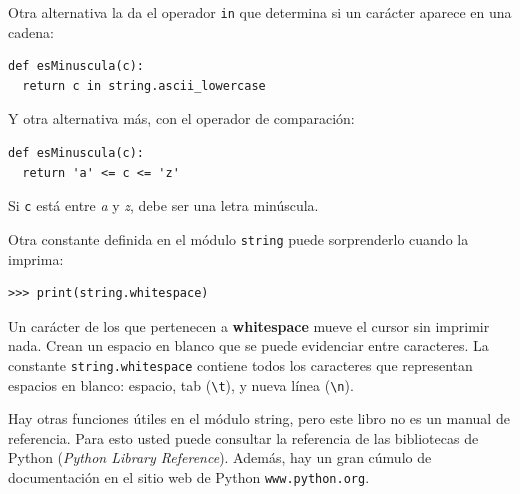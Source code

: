 Otra alternativa la da el operador \texttt{in} que determina si un
carácter aparece en una cadena:
\begin{verbatim}
def esMinuscula(c):
  return c in string.ascii_lowercase
\end{verbatim}
 Y otra alternativa más, con el operador de comparación:
\begin{verbatim}
def esMinuscula(c):
  return 'a' <= c <= 'z'
\end{verbatim}

Si \texttt{c} está entre {\em a} y {\em z}, debe ser una letra
minúscula.

Otra constante definida en el módulo \texttt{string} puede sorprenderlo
cuando la imprima:
\begin{verbatim}
>>> print(string.whitespace)
\end{verbatim}

Un carácter de los que pertenecen a \textbf{whitespace} mueve el cursor
sin imprimir nada. Crean un espacio en blanco que se puede evidenciar
entre caracteres. La constante \texttt{string.whitespace} contiene
todos los caracteres que representan espacios en blanco: espacio,
tab (\verb+\t+), y nueva línea (\verb+\n+).

 

Hay otras funciones útiles en el módulo string, pero este libro no
es un manual de referencia. Para esto usted puede consultar la referencia
de las bibliotecas de Python ({\em Python Library Reference}).
Además, hay un gran cúmulo de documentación en el sitio web de Python
\texttt{www.python.org}.


